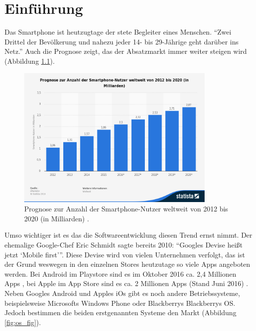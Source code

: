 \chapter{Einführung}\label{ch:intro}

Das Smartphone ist heutzugtage der stete Begleiter eines Menschen. \enquote{Zwei Drittel der Bevölkerung und nahezu jeder 14- bis 29-Jährige geht darüber ins Netz.} \cite{usage} Auch die Prognose zeigt, das der Absatzmarkt immer weiter steigen wird (Abbildung \ref{fig:prognose_fig}).

\begin{figure}[H]
	\begin{center}
		\includegraphics[width=0.86\textwidth]{images/prognose-zur-anzahl-der-smartphone-nutzer-weltweit-bis-2020.png}
		\caption{Prognose zur Anzahl der Smartphone-Nutzer weltweit von 2012 bis 2020 (in Milliarden) \cite{prognose}.}
		\label{fig:prognose_fig}
	\end{center}
\end{figure}

Umso wichtiger ist es das die Softwareentwicklung diesen Trend ernst nimmt. Der ehemalige Google-Chef Eric Schmidt sagte bereits 2010: \enquote{Googles Devise heißt jetzt \enquote{Mobile first}}. 
Diese Devise wird von vielen Unternehmen verfolgt, das ist der Grund weswegen in den einzelnen Stores heutzutage so viele Apps angeboten werden. Bei Android im Playstore sind es im Oktober 2016 ca. 2,4 Millionen Apps \cite{play_store}, bei Apple im App Store sind es ca. 2 Millionen Apps (Stand Juni 2016) \cite{app_store}. Neben Googles Android und Apples iOs gibt es noch andere Betriebssysteme, beispielsweise Microsofts Windows Phone oder Blackberrys Blackberrys OS. Jedoch bestimmen die beiden erstgenannten Systeme den Markt (Abbildung \ref{fig:os_fig}).

